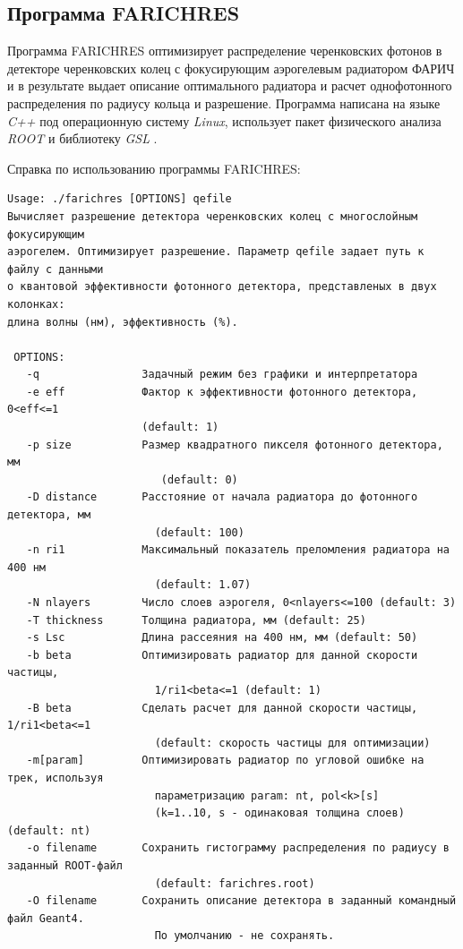 \documentclass[12pt]{article}
\begin{document}
\subsection{Программа FARICHRES}
Программа FARICHRES оптимизирует распределение черенковских фотонов в детекторе 
черенковских колец с фокусирующим аэрогелевым радиатором ФАРИЧ и в результате выдает описание оптимального радиатора и 
расчет однофотонного распределения по радиусу кольца и разрешение. 
Программа написана на языке {\em C++} под операционную систему {\em Linux}, использует пакет физического анализа {\em ROOT} \cite{root} и библиотеку {\em GSL} \cite{gsl}.

Справка по использованию программы FARICHRES:
{\small
\begin{verbatim}
Usage: ./farichres [OPTIONS] qefile
Вычисляет разрешение детектора черенковских колец с многослойным фокусирующим 
аэрогелем. Оптимизирует разрешение. Параметр qefile задает путь к файлу с данными 
о квантовой эффективности фотонного детектора, представленых в двух колонках: 
длина волны (нм), эффективность (%).

 OPTIONS:
   -q                Задачный режим без графики и интерпретатора
   -e eff            Фактор к эффективности фотонного детектора, 0<eff<=1 
                     (default: 1)
   -p size           Размер квадратного пикселя фотонного детектора, мм 
                        (default: 0)
   -D distance       Расстояние от начала радиатора до фотонного детектора, мм 
                       (default: 100)
   -n ri1            Максимальный показатель преломления радиатора на 400 нм 
                       (default: 1.07)
   -N nlayers        Число слоев аэрогеля, 0<nlayers<=100 (default: 3)
   -T thickness      Толщина радиатора, мм (default: 25)
   -s Lsc            Длина рассеяния на 400 нм, мм (default: 50)
   -b beta           Оптимизировать радиатор для данной скорости частицы, 
                       1/ri1<beta<=1 (default: 1)
   -B beta           Сделать расчет для данной скорости частицы, 1/ri1<beta<=1 
                       (default: скорость частицы для оптимизации)
   -m[param]         Оптимизировать радиатор по угловой ошибке на трек, используя 
                       параметризацию param: nt, pol<k>[s] 
                       (k=1..10, s - одинаковая толщина слоев) (default: nt)
   -o filename       Сохранить гистограмму распределения по радиусу в заданный ROOT-файл 
                       (default: farichres.root)
   -O filename       Сохранить описание детектора в заданный командный файл Geant4. 
                       По умолчанию - не сохранять.
\end{verbatim}
}
\end{document}
